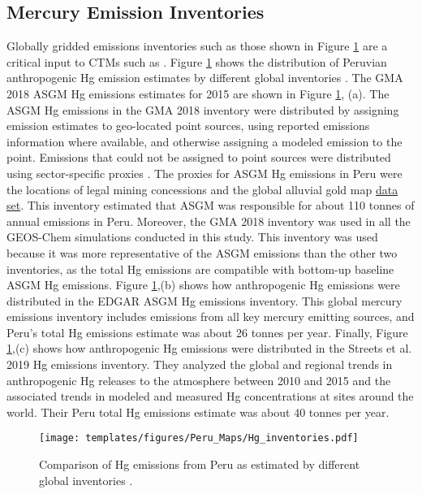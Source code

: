 \subsection{Mercury Emission Inventories}\label{c3_Mercury Emission Inventories}
\begin{flushleft}


Globally gridded emissions inventories such as those shown in Figure \ref{fig:Hg_inventories} are a critical input to CTMs such as \gc. Figure \ref{fig:Hg_inventories} shows the distribution of Peruvian anthropogenic Hg emission estimates by different global inventories \cite{united_nations_environment_programme_technical_2019,steenhuisen_development_2019,streets_global_2019,muntean_evaluating_2018}.  The GMA 2018 ASGM Hg emissions estimates for 2015 are shown in Figure \ref{fig:Hg_inventories}, (a). The ASGM Hg emissions in the GMA 2018 inventory were distributed by assigning emission estimates to geo-located point sources, using reported emissions information where available, and otherwise assigning a modeled emission to the point. Emissions that could not be assigned to point sources were distributed using sector-specific proxies \cite{steenhuisen_development_2019}. The proxies for ASGM Hg emissions in Peru were the locations of legal mining concessions and the global alluvial gold map \href{(https://data.globalforestwatch.org/search?collection=Dataset&q=mining)}{data set}. This inventory estimated that ASGM was responsible for about 110 tonnes of annual emissions in Peru. Moreover, the GMA 2018 inventory was used in all the GEOS-Chem simulations conducted in this study. This inventory was used because it was more representative of the ASGM emissions than the other two inventories, as the total Hg emissions are compatible with bottom-up baseline ASGM Hg emissions. Figure \ref{fig:Hg_inventories},(b) shows how anthropogenic Hg emissions were distributed in the EDGAR ASGM Hg emissions inventory\cite{muntean_evaluating_2018}. This global mercury emissions inventory includes emissions from all key mercury emitting sources, and Peru's total Hg emissions estimate was about 26 tonnes per year. Finally, Figure \ref{fig:Hg_inventories},(c) shows how anthropogenic Hg emissions were distributed in the  Streets et al. 2019 Hg emissions inventory\cite{streets_global_2019}. They analyzed the global and regional trends in anthropogenic Hg releases to the atmosphere between 2010 and 2015 and the associated trends in modeled and measured Hg concentrations at sites around the world. Their Peru total Hg emissions estimate was about 40 tonnes per year.

\end{flushleft}
\begin{figure}[H]
  \texttt{[image: templates/figures/Peru\_Maps/Hg\_inventories.pdf]}
  \centering
  \caption[Comparison of Hg emissions from Peru as estimated by different global inventories]{Comparison of Hg emissions from Peru as estimated by different global inventories \cite{united_nations_environment_programme_technical_2019,steenhuisen_development_2019,streets_global_2019,muntean_evaluating_2018}.}
  \label{fig:Hg_inventories}
\end{figure}
\FloatBarrier


